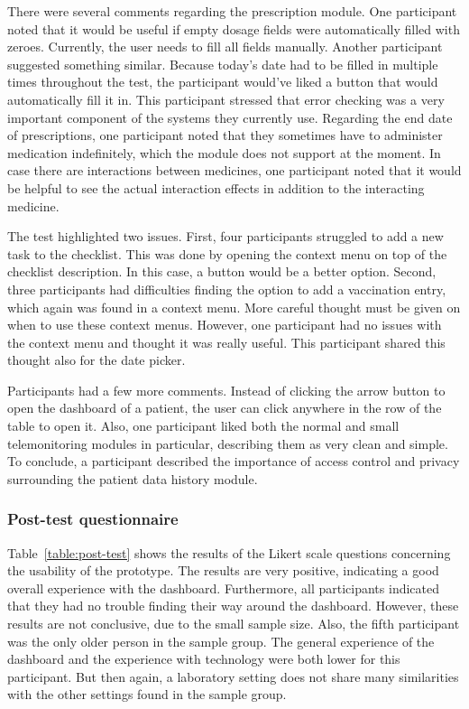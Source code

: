    There were several comments regarding the prescription module. One participant noted that it would be useful if empty dosage fields were automatically filled with zeroes. Currently, the user needs to fill all fields manually. Another participant suggested something similar. Because today's date had to be filled in multiple times throughout the test, the participant would've liked a button that would automatically fill it in. This participant stressed that error checking was a very important component of the systems they currently use. Regarding the end date of prescriptions, one participant noted that they sometimes have to administer medication indefinitely, which the module does not support at the moment. In case there are interactions between medicines, one participant noted that it would be helpful to see the actual interaction effects in addition to the interacting medicine.

    The test highlighted two issues. First, four participants struggled to add a new task to the checklist. This was done by opening the context menu on top of the checklist description. In this case, a button would be a better option. Second, three participants had difficulties finding the option to add a vaccination entry, which again was found in a context menu. More careful thought must be given on when to use these context menus. However, one participant had no issues with the context menu and thought it was really useful. This participant shared this thought also for the date picker.

    Participants had a few more comments. Instead of clicking the arrow button to open the dashboard of a patient, the user can click anywhere in the row of the table to open it. Also, one participant liked both the normal and small telemonitoring modules in particular, describing them as very clean and simple. To conclude, a participant described the importance of access control and privacy surrounding the patient data history module. 
    
    \subsubsection{Post-test questionnaire}

    Table~\ref{table:post-test} shows the results of the Likert scale questions concerning the usability of the prototype. The results are very positive, indicating a good overall experience with the dashboard. Furthermore, all participants indicated that they had no trouble finding their way around the dashboard. However, these results are not conclusive, due to the small sample size. Also, the fifth participant was the only older person in the sample group. The general experience of the dashboard and the experience with technology were both lower for this participant. But then again, a laboratory setting does not share many similarities with the other settings found in the sample group. 
    
